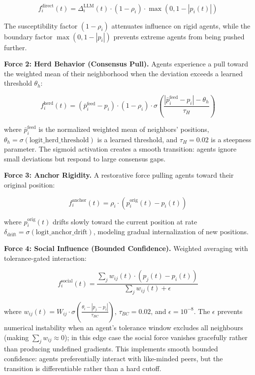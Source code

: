 \documentclass[12pt]{article}
\begin{document}
\begin{equation}\label{eq:1}
f_i^{\text{direct}}(t) = \Delta_i^{\text{LLM}}(t) \cdot (1 - \rho_i) \cdot \max(0, 1 - |p_i(t)|)
\end{equation}

The susceptibility factor $(1 - \rho_i)$ attenuates influence on rigid agents, while the boundary factor $\max(0, 1 - |p_i|)$ prevents extreme agents from being pushed further.

\textbf{Force 2: Herd Behavior (Consensus Pull).} Agents experience a pull toward the weighted mean of their neighborhood when the deviation exceeds a learned threshold $\theta_h$:

\begin{equation}\label{eq:2}
f_i^{\text{herd}}(t) = (\bar{p}_i^{\text{feed}} - p_i) \cdot (1 - \rho_i) \cdot \sigma\!\left(\frac{|\bar{p}_i^{\text{feed}} - p_i| - \theta_h}{\tau_H}\right)
\end{equation}

where $\bar{p}_i^{\text{feed}}$ is the normalized weighted mean of neighbors' positions, $\theta_h = \sigma(\text{logit\_herd\_threshold})$ is a learned threshold, and $\tau_H = 0.02$ is a steepness parameter. The sigmoid activation creates a smooth transition: agents ignore small deviations but respond to large consensus gaps.

\textbf{Force 3: Anchor Rigidity.} A restorative force pulling agents toward their original position:

\begin{equation}\label{eq:3}
f_i^{\text{anchor}}(t) = \rho_i \cdot (p_i^{\text{orig}}(t) - p_i(t))
\end{equation}

where $p_i^{\text{orig}}(t)$ drifts slowly toward the current position at rate $\delta_{\text{drift}} = \sigma(\text{logit\_anchor\_drift})$, modeling gradual internalization of new positions.

\textbf{Force 4: Social Influence (Bounded Confidence).} Weighted averaging with tolerance-gated interaction:

\begin{equation}\label{eq:4}
f_i^{\text{social}}(t) = \frac{\sum_j w_{ij}(t) \cdot (p_j(t) - p_i(t))}{\sum_j w_{ij}(t) + \epsilon}
\end{equation}

where $w_{ij}(t) = W_{ij} \cdot \sigma\!\left(\frac{\theta_i - |p_j - p_i|}{\tau_{BC}}\right)$, $\tau_{BC} = 0.02$, and $\epsilon = 10^{-8}$. The $\epsilon$ prevents numerical instability when an agent's tolerance window excludes all neighbours (making $\sum_j w_{ij} \approx 0$); in this edge case the social force vanishes gracefully rather than producing undefined gradients. This implements smooth bounded confidence: agents preferentially interact with like-minded peers, but the transition is differentiable rather than a hard cutoff.
\end{document}
